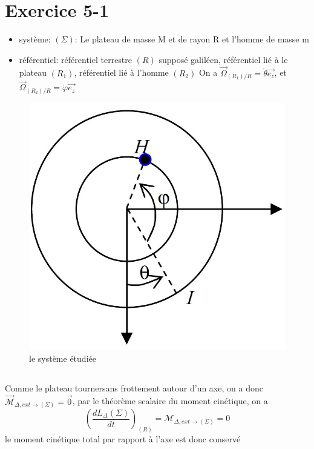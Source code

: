 \documentclass[a4paper,12pt]{book}
\begin{document}
\renewcommand{\labelitemi}{$\blacktriangleright$}
\renewcommand{\labelitemii}{$\bullet$}


\section{Exercice 5-1}
\begin{itemize}
    \item système: $(\Sigma)$: Le plateau de masse M et de rayon R et l'homme de masse m
    \item référentiel: référentiel terrestre $(R)$ supposé galiléen, référentiel lié à le plateau $(R_1)$, référentiel lié à l'homme $(R_2)$
    On a $\overrightarrow{\Omega}_{(R_1)/R}=\dot{\theta} \vec{e_z}$, et $\overrightarrow{\Omega}_{(R_2)/R}=\dot{\varphi} \vec{e_z}$
\end{itemize}
\begin{figure}[h]
    \begin{center}
    \includegraphics[scale=2]{meca5.jpg}
    \end{center}
    \caption{le système étudiée}
\end{figure}
\subsection{}
Comme le plateau tournersans frottement autour d'un axe, on a donc $\overrightarrow{\mathcal{M}}_{\Delta,ext \to (\Sigma)}=\vec{0}$, 
par le théorème scalaire du moment cinétique, on a 
$$
\left(\frac{dL_\Delta(\Sigma)}{dt}\right)_{(R)}=\mathcal{M}_{\Delta,ext \to (\Sigma)}=0
$$
le moment cinétique total par rapport à l'axe est donc conservé
\end{document}
